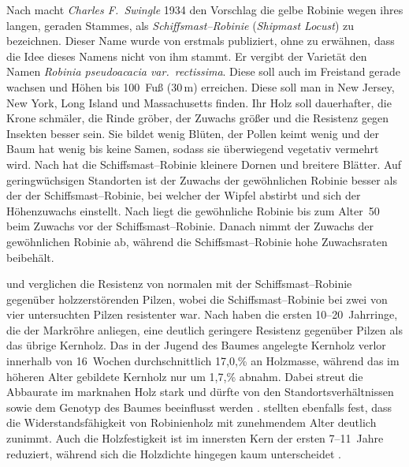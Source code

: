 \documentclass[twocolumn]{scrartcl}
\begin{document}
Nach \citet{detwiler1937robinie} macht \emph{Charles F.\ Swingle} 1934
den Vorschlag die gelbe Robinie wegen ihres langen, geraden Stammes,
als \emph{Schiffsmast--Robinie} (\emph{Shipmast Locust}) zu
bezeichnen. Dieser Name wurde von \citet{raber1936shipmast} erstmals
publiziert, ohne zu erwähnen, dass die Idee dieses Namens nicht von ihm
stammt. Er vergibt der Varietät den Namen \emph{Robinia pseudoacacia
var.\ rectissima}. Diese soll auch im Freistand gerade wachsen und
Höhen bis 100~Fuß (30\,m) erreichen. Diese soll man in New Jersey, New
York, Long Island und Massachusetts finden. Ihr Holz soll dauerhafter,
die Krone schmäler, die Rinde gröber, der Zuwachs größer und die
Resistenz gegen Insekten besser sein. Sie bildet wenig Blüten, der
Pollen keimt wenig und der Baum hat wenig bis keine Samen, sodass sie
überwiegend vegetativ vermehrt wird.
Nach \citet{hopp1941robinieUnterschied} hat die
Schiffsmast--Robinie kleinere Dornen und breitere Blätter. Auf
geringwüchsigen Standorten ist der Zuwachs der gewöhnlichen Robinie
besser als der der Schiffsmast--Robinie, bei welcher der Wipfel
abstirbt und sich der Höhenzuwachs einstellt.
Nach \citet{hopp1947robinie} liegt die gewöhnliche Robinie bis zum Alter~50
beim Zuwachs vor der
Schiffsmast--Robinie. Danach nimmt der Zuwachs der gewöhnlichen
Robinie ab, während die Schiffsmast--Robinie hohe Zuwachsraten
beibehält.

\citet{hirt1938robinie} und \citet{toole1938robinie} verglichen die
Resistenz von normalen mit der Schiffsmast--Robinie gegenüber
holzzerstörenden Pilzen, wobei die Schiffsmast--Robinie bei zwei von
vier untersuchten Pilzen resistenter war.
Nach \citet{duenisch2009robineHolzJungAlt} haben die ersten
10--20~Jahrringe, die der Markröhre anliegen, eine deutlich geringere
Resistenz gegenüber Pilzen als das übrige Kernholz. Das in der Jugend
des Baumes angelegte Kernholz verlor innerhalb von 16~Wochen
durchschnittlich 17,0,\% an Holzmasse, während das im höheren Alter
gebildete Kernholz nur um 1,7,\% abnahm. Dabei streut die Abbaurate im
marknahen Holz stark und dürfte von den Standortsverhältnissen sowie
dem Genotyp des Baumes beeinflusst werden \citep{brischke2024robineDauerhaftigkeit}.
\citet{szczepkowski2025robinePilze} stellten ebenfalls fest, dass die
Widerstandsfähigkeit von Robinienholz mit zunehmendem Alter deutlich
zunimmt.
Auch die Holzfestigkeit ist im innersten Kern der ersten 7--11~Jahre
reduziert, während sich die Holzdichte hingegen kaum unterscheidet
\citep{adamopoulos2007jungesUndAltesRobinienholz,bijak2021robinienholz}.
\end{document}
